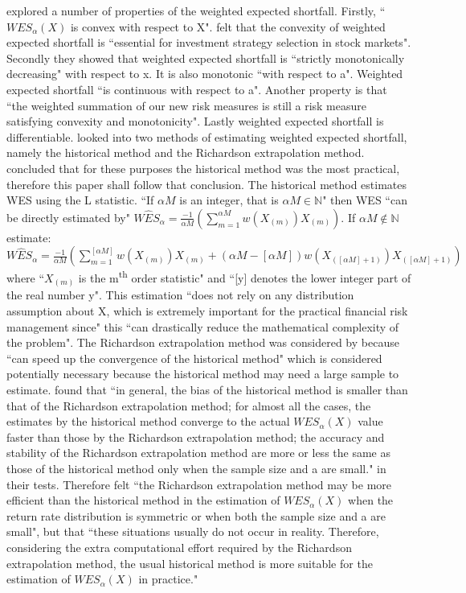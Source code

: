 \documentclass[12pt,a4paper]{article}
\newcommand{\ts}{\textsuperscript}
\begin{document}
 \cite{CHEN20111777} explored a number of properties of the weighted expected shortfall. Firstly, ``$WES_{\alpha}(X)$ is convex with respect to X". \cite{CHEN20111777} felt that the convexity of weighted expected shortfall is ``essential for investment strategy selection in stock markets". Secondly they showed that weighted expected shortfall is  ``strictly monotonically decreasing" with respect to x. It is also monotonic ``with respect to a". Weighted expected shortfall ``is continuous with respect to a". Another property is that ``the weighted summation of our new risk measures is still a risk measure satisfying convexity and monotonicity". Lastly weighted expected shortfall is differentiable. \cite{CHEN20111777} looked into two methods of estimating weighted expected shortfall, namely the historical method and the Richardson extrapolation method. \cite{CHEN20111777} concluded that for these purposes the historical method was the most practical, therefore this paper shall follow that conclusion. The historical method estimates WES using the L statistic. ``If $\alpha M$ is an integer, that is $\alpha M \in \mathbb{N}$" then WES ``can be directly estimated by" $W \hat{E} S _{\alpha} = \frac{-1}{\alpha M} (\sum_{m=1}^{\alpha M} w(X_{(m)}) X_{(m)}) $. If $\alpha M \notin \mathbb{N}$ estimate: $W \hat{E} S _{\alpha} = \frac{-1}{\alpha M} (\sum_{m=1}^{[\alpha M]} w(X_{(m)}) X_{(m)} + (\alpha M - [\alpha M])w(X_{([\alpha M] + 1)})X_{([\alpha M] + 1)}) $
 where ``$X_{(m)}$ is the m\ts{th} order statistic" and ``[y] denotes the lower integer part of the real number y". This estimation ``does not rely on any distribution assumption
about X, which is extremely important for the practical financial risk management since" this ``can drastically reduce the mathematical complexity of the problem". The Richardson extrapolation method was considered by  \cite{CHEN20111777} because ``can speed up the convergence of the historical method" which is considered potentially necessary because the historical method may need a large sample to estimate. \cite{CHEN20111777} found that ``in general, the bias of the historical method is smaller than that of the Richardson extrapolation method; for almost all the cases, the estimates by the historical method converge to the actual $WES_{\alpha}(X)$ value faster than those by the Richardson extrapolation method; the accuracy and stability of the Richardson extrapolation method are more or less the same as those of the historical method only when the sample size and a are small." in their tests. Therefore \cite{CHEN20111777} felt ``the Richardson extrapolation method may be more efficient than the historical method in the estimation of $WES_{\alpha}(X)$ when the return rate distribution is symmetric or when both the sample size and a are small", but that ``these situations usually
do not occur in reality. Therefore, considering the extra computational effort required by the Richardson extrapolation method, the usual historical method is more suitable for the estimation of $WES_{\alpha}(X)$ in practice."
\end{document}
